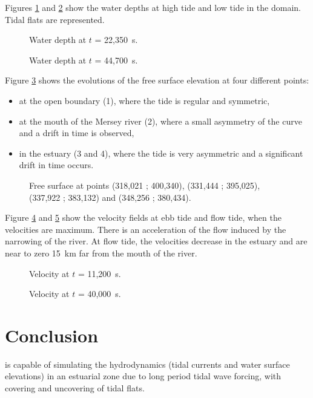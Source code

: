 Figures \ref{fig:mersey:WD22} and \ref{fig:mersey:WD44} show the water depths at
high tide and low tide in the domain.
Tidal flats are represented.

\begin{figure}[H]
 \centering
 \caption{Water depth at $t$ = 22,350~s.}
 \label{fig:mersey:WD22}
\end{figure}

\begin{figure}[H]
 \centering
 \caption{Water depth at $t$ = 44,700~s.}
 \label{fig:mersey:WD44}
\end{figure}

Figure \ref{fig:mersey:WDTS} shows the evolutions of the free surface
elevation at four different points:
\begin{itemize}
\item at the open boundary (1), where the tide is regular and symmetric,
\item at the mouth of the Mersey river (2), where a small asymmetry of the curve
  and a drift in time is observed,
\item in the estuary (3 and 4), where the tide is very asymmetric and a
  significant drift in time occurs.
\end{itemize}

\begin{figure}[H]
 \centering
 \caption{Free surface at points (318,021 ; 400,340), (331,444 ; 395,025),
 (337,922 ; 383,132) and (348,256 ; 380,434).}
 \label{fig:mersey:WDTS}
\end{figure}

Figure \ref{fig:mersey:Velocity} and \ref{fig:mersey:Velocity40} show the
velocity fields at ebb tide and flow tide, when the velocities are maximum.
There is an acceleration of the flow induced by the narrowing of the river.
At flow tide, the velocities decrease in the estuary and are near to zero 15~km
far from the mouth of the river.

\begin{figure}[H]
 \centering
 \caption{Velocity at $t$ = 11,200~s.}
 \label{fig:mersey:Velocity}
\end{figure}

\begin{figure}[H]
 \centering
 \caption{Velocity at $t$ = 40,000~s.}
 \label{fig:mersey:Velocity40}
\end{figure}

\section{Conclusion}
 is capable of simulating the hydrodynamics (tidal currents and
water surface elevations) in an estuarial zone due to long period tidal wave
forcing, with covering and uncovering of tidal flats.
